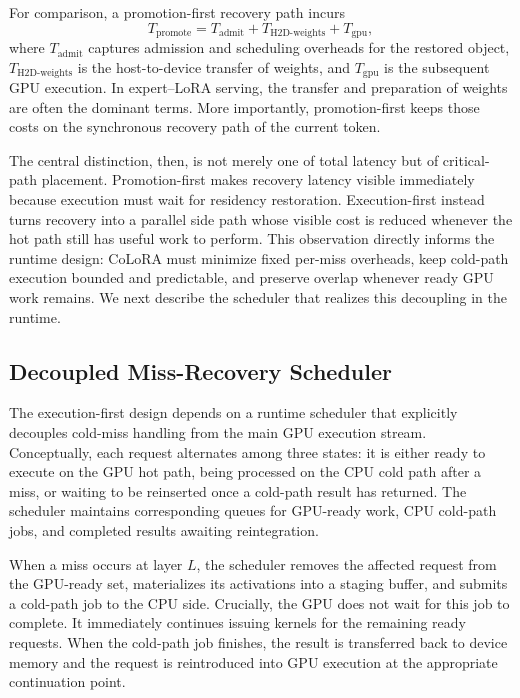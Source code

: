 \documentclass[sigplan,anonymous,review,nonacm]{acmart}
\begin{document}
For comparison, a promotion-first recovery path incurs
\begin{equation}
T_{\text{promote}} = T_{\text{admit}} + T_{\text{H2D-weights}} + T_{\text{gpu}},
\end{equation}
where $T_{\text{admit}}$ captures admission and scheduling overheads for the restored object, $T_{\text{H2D-weights}}$ is the host-to-device transfer of weights, and $T_{\text{gpu}}$ is the subsequent GPU execution. In expert--LoRA serving, the transfer and preparation of weights are often the dominant terms. More importantly, promotion-first keeps those costs on the synchronous recovery path of the current token.

The central distinction, then, is not merely one of total latency but of critical-path placement. Promotion-first makes recovery latency visible immediately because execution must wait for residency restoration. Execution-first instead turns recovery into a parallel side path whose visible cost is reduced whenever the hot path still has useful work to perform. This observation directly informs the runtime design: CoLoRA must minimize fixed per-miss overheads, keep cold-path execution bounded and predictable, and preserve overlap whenever ready GPU work remains. We next describe the scheduler that realizes this decoupling in the runtime.

\subsection{Decoupled Miss-Recovery Scheduler}
\label{subsec:scheduler}

The execution-first design depends on a runtime scheduler that explicitly decouples cold-miss handling from the main GPU execution stream. Conceptually, each request alternates among three states: it is either ready to execute on the GPU hot path, being processed on the CPU cold path after a miss, or waiting to be reinserted once a cold-path result has returned. The scheduler maintains corresponding queues for GPU-ready work, CPU cold-path jobs, and completed results awaiting reintegration.

When a miss occurs at layer $L$, the scheduler removes the affected request from the GPU-ready set, materializes its activations into a staging buffer, and submits a cold-path job to the CPU side. Crucially, the GPU does not wait for this job to complete. It immediately continues issuing kernels for the remaining ready requests. When the cold-path job finishes, the result is transferred back to device memory and the request is reintroduced into GPU execution at the appropriate continuation point.
\end{document}
